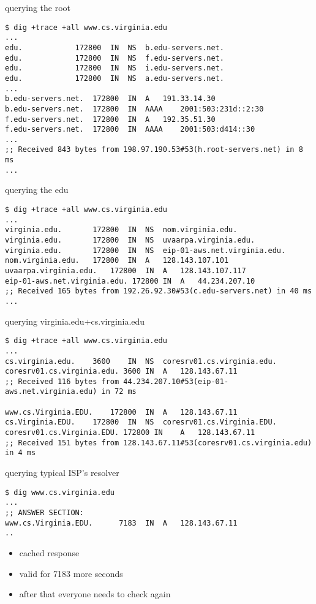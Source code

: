 
\begin{frame}[fragile]{querying the root}
\begin{Verbatim}[fontsize=\scriptsize]
$ dig +trace +all www.cs.virginia.edu
...
edu.			172800	IN	NS	b.edu-servers.net.
edu.			172800	IN	NS	f.edu-servers.net.
edu.			172800	IN	NS	i.edu-servers.net.
edu.			172800	IN	NS	a.edu-servers.net.
...
b.edu-servers.net.	172800	IN	A	191.33.14.30
b.edu-servers.net.	172800	IN	AAAA	2001:503:231d::2:30
f.edu-servers.net.	172800	IN	A	192.35.51.30
f.edu-servers.net.	172800	IN	AAAA	2001:503:d414::30
...
;; Received 843 bytes from 198.97.190.53#53(h.root-servers.net) in 8 ms
...
\end{Verbatim}
\end{frame}

\begin{frame}[fragile]{querying the edu}
\begin{Verbatim}[fontsize=\scriptsize]
$ dig +trace +all www.cs.virginia.edu
...
virginia.edu.		172800	IN	NS	nom.virginia.edu.
virginia.edu.		172800	IN	NS	uvaarpa.virginia.edu.
virginia.edu.		172800	IN	NS	eip-01-aws.net.virginia.edu.
nom.virginia.edu.	172800	IN	A	128.143.107.101
uvaarpa.virginia.edu.	172800	IN	A	128.143.107.117
eip-01-aws.net.virginia.edu. 172800 IN	A	44.234.207.10
;; Received 165 bytes from 192.26.92.30#53(c.edu-servers.net) in 40 ms
...
\end{Verbatim}
\end{frame}
\begin{frame}[fragile]{querying virginia.edu+cs.virginia.edu}
\begin{Verbatim}[fontsize=\scriptsize]
$ dig +trace +all www.cs.virginia.edu
...
cs.virginia.edu.	3600	IN	NS	coresrv01.cs.virginia.edu.
coresrv01.cs.virginia.edu. 3600	IN	A	128.143.67.11
;; Received 116 bytes from 44.234.207.10#53(eip-01-aws.net.virginia.edu) in 72 ms

www.cs.Virginia.EDU.	172800	IN	A	128.143.67.11
cs.Virginia.EDU.	172800	IN	NS	coresrv01.cs.Virginia.EDU.
coresrv01.cs.Virginia.EDU. 172800 IN	A	128.143.67.11
;; Received 151 bytes from 128.143.67.11#53(coresrv01.cs.virginia.edu) in 4 ms
\end{Verbatim}
\end{frame}

\begin{frame}[fragile]{querying typical ISP's resolver}
\begin{Verbatim}[fontsize=\scriptsize]
$ dig www.cs.virginia.edu
...
;; ANSWER SECTION:
www.cs.Virginia.EDU.	  7183	IN	A	128.143.67.11
..
\end{Verbatim}
\begin{itemize}
\item cached response
\item valid for 7183  more seconds
\item after that everyone needs to check again
\end{itemize}
\end{frame}

